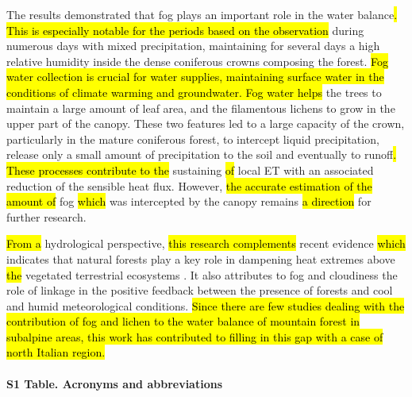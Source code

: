 \documentclass[10pt,letterpaper]{article}
\begin{document}
The results demonstrated that fog plays an important role in the water balance\hl{. This is especially notable for the periods based on the observation }during numerous days with mixed precipitation, maintaining for several days a high relative humidity inside the dense coniferous crowns composing the forest. \hl{Fog water collection is crucial for water supplies, maintaining surface water in the conditions of climate warming and groundwater. Fog water helps }the trees to maintain a large amount of leaf area, and the filamentous lichens to grow in the upper part of the canopy. These two features led to a large capacity of the crown, particularly in the mature coniferous forest, to intercept liquid precipitation, release only a small amount of precipitation to the soil and eventually to runoff\hl{. These processes contribute to the }sustaining \hl{of }local ET with an associated reduction of the sensible heat flux. However, \hl{the accurate estimation of the amount of} fog \hl{which }was intercepted by the canopy remains \hl{a direction} for further research.

\hl{From a} hydrological perspective, \hl{this research complements }recent evidence \hl{which} indicates that natural forests play a key role in dampening heat extremes above \hl{the }vegetated terrestrial ecosystems \cite{Alkama,LIN20171286,DUVEILLER2020104382}. It also attributes to fog and cloudiness the role of linkage in the positive feedback between the presence of forests \cite{Duveilleretal2021} and cool and humid meteorological conditions. \hl{Since there are few studies dealing with the contribution of fog and lichen to the water balance of mountain forest in subalpine areas, this work has contributed to filling in this gap with a case of north Italian region.}

\paragraph*{S1 Table. Acronyms and abbreviations}\label{Acronyms}
\end{document}
